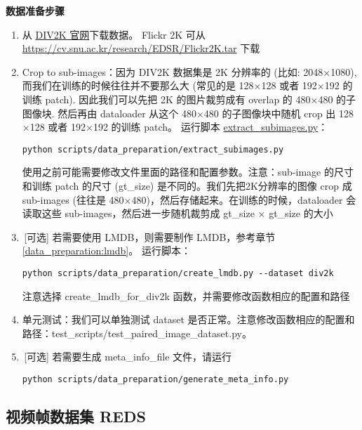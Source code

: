 \documentclass[../main.tex]{subfiles}
\begin{document}
\noindent\textbf{数据准备步骤}
\begin{enumerate}
    \item 从 \href{https://data.vision.ee.ethz.ch/cvl/DIV2K}{DIV2K 官网}下载数据。 Flickr 2K 可从 \url{https://cv.snu.ac.kr/research/EDSR/Flickr2K.tar} 下载
    \item Crop to sub-images：因为 DIV2K 数据集是 2K 分辨率的 (比如: 2048$\times$1080), 而我们在训练的时候往往并不要那么大 (常见的是 128$\times$128 或者 192$\times$192 的训练 patch). 因此我们可以先把 2K 的图片裁剪成有 overlap 的 480$\times$480 的子图像块. 然后再由 dataloader 从这个 480$\times$480 的子图像块中随机 crop 出 128$\times$128 或者 192$\times$192 的训练 patch。
          运行脚本 \href{https://github.com/XPixelGroup/BasicSR/blob/master/scripts/data_preparation/extract_subimages.py}{extract\_subimages.py}：
          \begin{verbatim}
python scripts/data_preparation/extract_subimages.py
\end{verbatim}
          使用之前可能需要修改文件里面的路径和配置参数。注意：sub-image 的尺寸和训练 patch 的尺寸 (gt\_size) 是不同的。我们先把2K分辨率的图像 crop 成 sub-images (往往是 480$\times$480)，然后存储起来。在训练的时候，dataloader 会读取这些 sub-images，然后进一步随机裁剪成 gt\_size $\times$ gt\_size 的大小
    \item\,[可选] 若需要使用 LMDB，则需要制作 LMDB，参考章节\ref{data_preparation:lmdb}。
          运行脚本：
          \begin{verbatim}
python scripts/data_preparation/create_lmdb.py --dataset div2k
\end{verbatim}
          注意选择 create\_lmdb\_for\_div2k 函数，并需要修改函数相应的配置和路径
    \item 单元测试：我们可以单独测试 dataset 是否正常。注意修改函数相应的配置和路径：test\_scripts/test\_paired\_image\_dataset.py。
    \item\,[可选] 若需要生成 meta\_info\_file 文件，请运行
          \begin{verbatim}
python scripts/data_preparation/generate_meta_info.py
\end{verbatim}
\end{enumerate}

\subsection{视频帧数据集 REDS}
\end{document}
